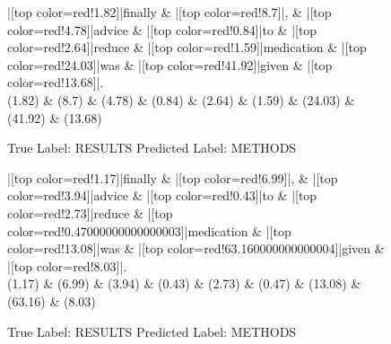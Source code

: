 \documentclass[a4paper, landscape]{article}
\begin{document}
\begin{figure}
\begin{center}
\begin{dependency}
\begin{deptext}
|[top color=red!1.82]|finally \& |[top color=red!8.7]|, \& |[top color=red!4.78]|advice \& |[top color=red!0.84]|to \& |[top color=red!2.64]|reduce \& |[top color=red!1.59]|medication \& |[top color=red!24.03]|was \& |[top color=red!41.92]|given \& |[top color=red!13.68]|.\\
(1.82) \& (8.7) \& (4.78) \& (0.84) \& (2.64) \& (1.59) \& (24.03) \& (41.92) \& (13.68)\\
\end{deptext}
\end{dependency}
\end{center}
\caption{True Label: RESULTS Predicted Label: METHODS}
\end{figure}
\clearpage
\begin{figure}
\begin{center}
\begin{dependency}
\begin{deptext}
|[top color=red!1.17]|finally \& |[top color=red!6.99]|, \& |[top color=red!3.94]|advice \& |[top color=red!0.43]|to \& |[top color=red!2.73]|reduce \& |[top color=red!0.47000000000000003]|medication \& |[top color=red!13.08]|was \& |[top color=red!63.160000000000004]|given \& |[top color=red!8.03]|.\\
(1.17) \& (6.99) \& (3.94) \& (0.43) \& (2.73) \& (0.47) \& (13.08) \& (63.16) \& (8.03)\\
\end{deptext}
\end{dependency}
\end{center}
\caption{True Label: RESULTS Predicted Label: METHODS}
\end{figure}
\end{document}
